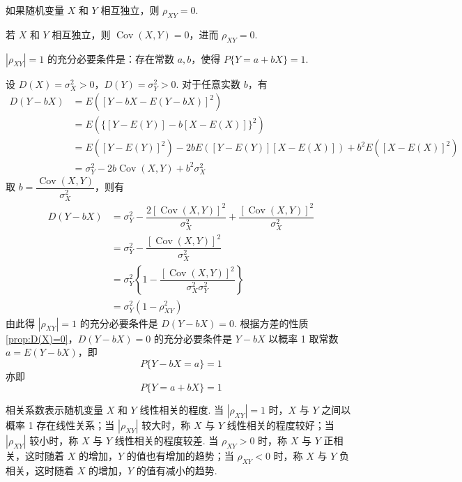 \begin{property}
    如果随机变量 $X$ 和 $Y$ 相互独立，则 $\rho_{XY} = 0$.
\end{property}

\vspace{-1em}

\begin{myproof}
    若 $X$ 和 $Y$ 相互独立，则 $\operatorname{Cov}(X,Y) = 0$，进而 $\rho_{XY} = 0$.
\end{myproof}

\begin{property}
    $|\rho_{XY}|=1$ 的充分必要条件是：存在常数 $a,b$，使得 $P\{Y=a+bX\}=1$.
\end{property}

\begin{myproof}
    设 $D(X) = \sigma_X^2 > 0$，$D(Y) = \sigma_Y^2 > 0$. 对于任意实数 $b$，有
    $$
    \begin{aligned}
        D(Y-bX) &= E([Y-bX - E(Y-bX)]^2) \\
        &= E( \{[Y-E(Y)] - b[X-E(X)]\}^2 ) \\
        &= E([Y-E(Y)]^2) - 2bE([Y-E(Y)][X-E(X)]) + b^2 E([X-E(X)]^2) \\
        &= \sigma_Y^2 - 2b \operatorname{Cov}(X,Y) + b^2 \sigma_X^2
    \end{aligned}
    $$
    取 $b = \dfrac{\operatorname{Cov}(X,Y)}{\sigma_X^2}$，则有
    $$
    \begin{aligned}
        D(Y-bX) &= \sigma_Y^2 - \dfrac{2 [\operatorname{Cov}(X,Y)]^2}{\sigma_X^2} + \dfrac{[\operatorname{Cov}(X,Y)]^2}{\sigma_X^2} \\
        &= \sigma_Y^2 - \dfrac{[\operatorname{Cov}(X,Y)]^2}{\sigma_X^2} \\
        &= \sigma_Y^2 \left\{ 1 - \dfrac{[\operatorname{Cov}(X,Y)]^2}{\sigma_X^2 \sigma_Y^2} \right\} \\
        &= \sigma_Y^2 (1 - \rho_{XY}^2)
    \end{aligned}
    $$
    由此得 $|\rho_{XY}|=1$ 的充分必要条件是 $D(Y-bX)=0$. 根据方差的性质\ref*{prop:D(X)=0}，$D(Y-bX)=0$ 的充分必要条件是 $Y-bX$ 以概率 1 取常数 $a=E(Y-bX)$，即
    $$
    P \{ Y-bX=a \} = 1
    $$
    亦即
    $$
    P\{Y=a+bX\}=1
    $$
\end{myproof}

相关系数表示随机变量 $X$ 和 $Y$ 线性相关的程度. 当 $|\rho_{XY}|=1$ 时，$X$ 与 $Y$ 之间以概率 1 存在线性关系；当 $|\rho_{XY}|$ 较大时，称 $X$ 与 $Y$ 线性相关的程度较好；当 $|\rho_{XY}|$ 较小时，称 $X$ 与 $Y$ 线性相关的程度较差. 当 $\rho_{XY} > 0$ 时，称 $X$ 与 $Y$ 正相关，这时随着 $X$ 的增加，$Y$ 的值也有增加的趋势；当 $\rho_{XY} < 0$ 时，称 $X$ 与 $Y$ 负相关，这时随着 $X$ 的增加，$Y$ 的值有减小的趋势.

